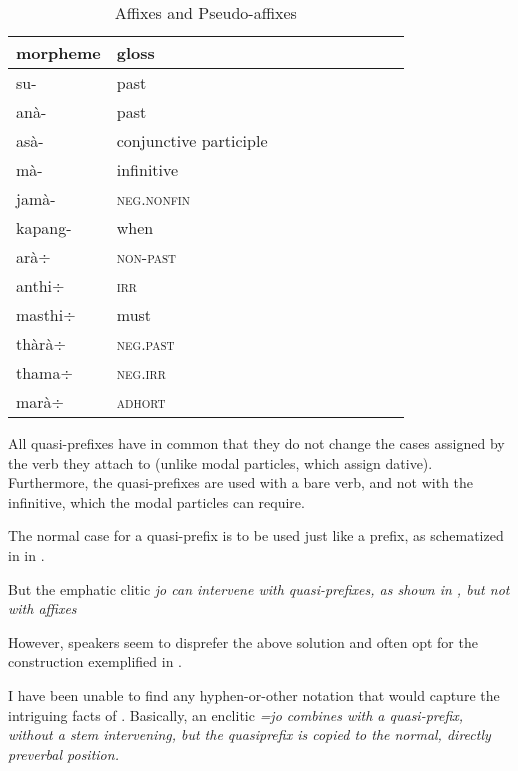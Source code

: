 \begin{table}
	\centering
	\begin{tabular}{llllllllll}
	morpheme	& gloss \\
	\hline
	su- & past \\ 
	anà- & past \\
	asà- & conjunctive participle  \\
	mà- & infinitive  \\
	jamà-&  \textsc{neg.nonfin} \\
	kapang-& when  \\
	\hline
	arà$\div$ &  \textsc{non-past}  \\
	anthi$\div$&  \textsc{irr} \\
	masthi$\div$&  must \\ 
	thàrà$\div$ & \textsc{neg.past}   \\
	thama$\div$&  \textsc{neg.irr} \\
	marà$\div$&  \textsc{adhort} \\
	\hline
	\end{tabular}
	\caption{Affixes and Pseudo-affixes}
	\label{tab:Affixes}
\end{table}

All quasi-prefixes have in common that they do not change the cases assigned by the verb they attach to (unlike modal particles, which assign dative). Furthermore, the quasi-prefixes are used with a bare verb, and not with the infinitive, which the modal particles can require.

The normal case for a quasi-prefix is to be used just like a prefix, as schematized in in .


But the emphatic clitic \em jo \em can intervene with quasi-prefixes, as shown in , but not with affixes 



However, speakers seem to disprefer the above solution and often opt for the construction exemplified in .



I have been unable to find any hyphen-or-other notation that would capture the intriguing facts of . Basically, an enclitic \em =jo \em combines with a quasi-prefix, without a stem intervening, but the quasiprefix is copied to the normal, directly preverbal position.


